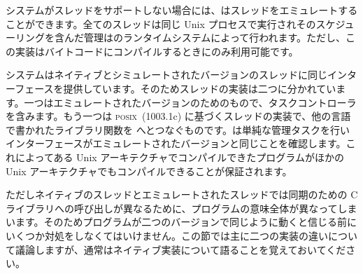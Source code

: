 システムがスレッドをサポートしない場合には、\ocaml はスレッドをエミュレートすることができます。全てのスレッドは同じ Unix プロセスで実行されそのスケジューリングを含んだ管理は\ocaml のランタイムシステムによって行われます。ただし、この実装はバイトコードにコンパイルするときにのみ利用可能です。

\ocaml システムはネイティブとシミュレートされたバージョンのスレッドに同じインターフェースを提供しています。そのためスレッドの実装は二つに分かれています。一つはエミュレートされたバージョンのためのもので、タスクコントローラを含みます。もう一つは \textsc{posix}~(1003.1c) に基づくスレッドの実装で、他の言語で書かれたライブラリ関数を \ocaml へとつなぐものです。\ocaml は単純な管理タスクを行いインターフェースがエミュレートされたバージョンと同じことを確認します。これによってある  Unix アーキテクチャでコンパイルできたプログラムがほかの Unix アーキテクチャでもコンパイルできることが保証されます。

ただしネイティブのスレッドとエミュレートされたスレッドでは同期のための C ライブラリへの呼び出しが異なるために、プログラムの意味全体が異なってしまいます。そのためプログラムが二つのバージョンで同じように動くと信じる前にいくつか対処をしなくてはいけません。この節では主に二つの実装の違いについて議論しますが、通常はネイティブ実装について語ることを覚えておいてください。


